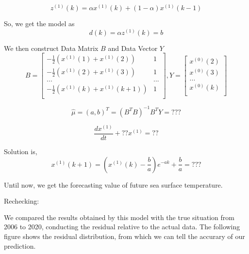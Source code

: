 \documentclass{mcmthesis}
\begin{document}
\begin{equation*}
	z^{(1)}(k) = \alpha x^{(1)}(k) + (1-\alpha)x^{(1)}(k-1)
\end{equation*}\par
	So, we get the model as
\begin{equation*}
	d(k) = \alpha z^{(1)}(k) = b
\end{equation*}\par
	We then construct Data Matrix $B$ and Data Vector $Y$
\begin{equation}
	B =  \left[ \begin{matrix}
						-\frac{1}{2}(x^{(1)}(1)+x^{(1)}(2))  & 1 \\
						-\frac{1}{2}(x^{(1)}(2)+x^{(1)}(3))  & 1 \\
										...									& ... \\
						-\frac{1}{2}(x^{(1)}(k)+x^{(1)}(k+1))  & 1 \\
\end{matrix}\right],
	Y =  \left[ \begin{matrix}
						x^{(0)}(2)\\
						x^{(0)}(3)\\
							...    \\
						x^{(0)}(k)\\
\end{matrix}\right]
\end{equation}\par
\begin{equation*} 
	\hat{\mu} = (a, b)^{T} = (B^{T}B)^{-1}B^{T}Y = ???
\end{equation*}\par
\begin{equation*}
	\frac{dx^{(1)}}{dt} + ?? x^{(1)} = ??
\end{equation*}\par
	Solution is, 
\begin{equation*}
	x^{(1)}(k+1) = (x^{(1)}(k) - \frac{b}{a})e^{-ak} + \frac{b}{a} = ???
\end{equation*}\par
	Until now, we get the forecasting value of future sea surface temperature. \par
	Rechecking: \par
	We compared the results obtained by this model with the true situation from 2006 to 2020, conducting the residual relative to the actual data. The following figure shows the residual distribution, from which we can tell the accurary of our prediction.\par
\end{document}
